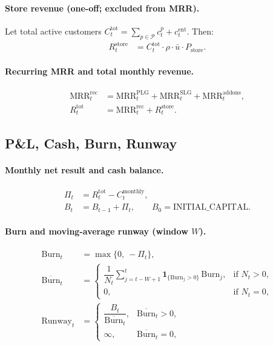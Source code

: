 \paragraph{Store revenue (one-off; excluded from MRR).}
Let total active customers $C^{\mathrm{tot}}_t = \sum_{p \in \mathcal{P}} c^p_t + c^{\mathrm{ent}}_t$. Then:
\begin{align}
R^{\mathrm{store}}_t 
  &= C^{\mathrm{tot}}_t \cdot \rho \cdot \bar{u} \cdot P_{\mathrm{store}}.
\end{align}

\paragraph{Recurring MRR and total monthly revenue.}
\begin{align}
\mathrm{MRR}^{\mathrm{rec}}_t 
  &= \mathrm{MRR}^{\mathrm{PLG}}_t + \mathrm{MRR}^{\mathrm{SLG}}_t + \mathrm{MRR}^{\mathrm{addons}}_t,\\
R^{\mathrm{tot}}_t 
  &= \mathrm{MRR}^{\mathrm{rec}}_t + R^{\mathrm{store}}_t.
\end{align}

\subsection{P\&L, Cash, Burn, Runway}
\paragraph{Monthly net result and cash balance.}
\begin{align}
\Pi_t &= R^{\mathrm{tot}}_t - C^{\mathrm{monthly}}_t,\\
B_t &= B_{t-1} + \Pi_t, \qquad B_0 = \text{INITIAL\_CAPITAL}.
\end{align}

\paragraph{Burn and moving-average runway (window $W$).}
\begin{align}
\mathrm{Burn}_t &= \max\{0,\ -\Pi_t\},\\
\overline{\mathrm{Burn}}_t 
  &= 
  \begin{cases}
    \dfrac{1}{N_t} \sum_{j=t-W+1}^{t} \mathbf{1}_{\{\mathrm{Burn}_j>0\}}\, \mathrm{Burn}_j, & \text{if } N_t>0,\\[6pt]
    0, & \text{if } N_t=0,
  \end{cases}\\
\mathrm{Runway}_t 
  &= 
  \begin{cases}
    \dfrac{B_t}{\overline{\mathrm{Burn}}_t}, & \overline{\mathrm{Burn}}_t > 0,\\[6pt]
    \infty, & \overline{\mathrm{Burn}}_t = 0,
  \end{cases}
\end{align}
